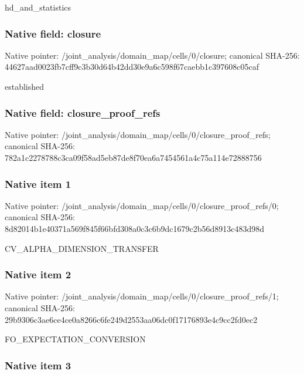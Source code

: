 \documentclass[10pt,a4paper]{article}
\begin{document}
hd\_and\_statistics


\subsubsection{Native field: closure}


Native pointer: /joint\_analysis/domain\_m\allowbreak{}ap/cells/0/closure; canonical SHA-256: 44627aad0023fb7cff9c3b30\allowbreak{}d64b42dd30e9a6c598f67cae\allowbreak{}bb1c397608c05caf


established


\subsubsection{Native field: closure\_proof\_refs}


Native pointer: /joint\_analysis/domain\_m\allowbreak{}ap/cells/0/closure\_proof\allowbreak{}\_refs; canonical SHA-256: 782a1c2278788c3ca09f58ad\allowbreak{}5eb87de8f70ea6a7454561a4\allowbreak{}c75a114e72888756



\subsubsection{Native item 1}


Native pointer: /joint\_analysis/domain\_m\allowbreak{}ap/cells/0/closure\_proof\allowbreak{}\_refs/0; canonical SHA-256: 8d82014b1e40371a569f845f\allowbreak{}66bfd308a0c3c6b9dc1679c2\allowbreak{}b56d8913c483d98d


CV\_ALPHA\_DIMENSION\_TRANSFER


\subsubsection{Native item 2}


Native pointer: /joint\_analysis/domain\_m\allowbreak{}ap/cells/0/closure\_proof\allowbreak{}\_refs/1; canonical SHA-256: 29b9306c3ae6ce4ce0a8266c\allowbreak{}6fe249d2553aa06dc0f17176\allowbreak{}893e4c9cc2fd0ec2


FO\_EXPECTATION\_CONVERSION


\subsubsection{Native item 3}
\end{document}
